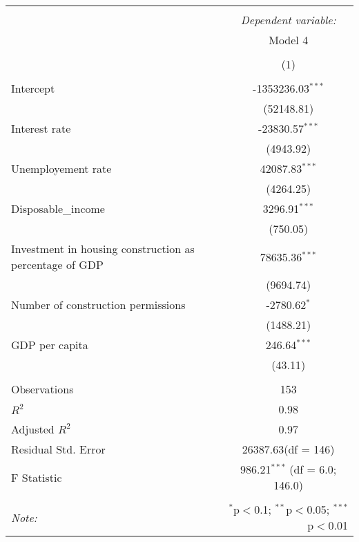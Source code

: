\begin{table}[!htbp] \centering
\begin{tabular}{@{\extracolsep{5pt}}lc}
\\[-1.8ex]\hline
\hline \\[-1.8ex]
& \multicolumn{1}{c}{\textit{Dependent variable:}} \
\cr \cline{1-2}
\\[-1.8ex] & \multicolumn{1}{c}{Model 4} \\\\[-1.8ex] & (1) \\
\hline \\[-1.8ex]
 Intercept & -1353236.03$^{***}$ \\
  & (52148.81) \\
 Interest rate & -23830.57$^{***}$ \\
  & (4943.92) \\
 Unemployement rate & 42087.83$^{***}$ \\
  & (4264.25) \\
 Disposable_income & 3296.91$^{***}$ \\
  & (750.05) \\
 Investment in housing construction as percentage of GDP & 78635.36$^{***}$ \\
  & (9694.74) \\
 Number of construction permissions & -2780.62$^{*}$ \\
  & (1488.21) \\
 GDP per capita & 246.64$^{***}$ \\
  & (43.11) \\
\hline \\[-1.8ex]
 Observations & 153 \\
 $R^2$ & 0.98 \\
 Adjusted $R^2$ & 0.97 \\
 Residual Std. Error & 26387.63(df = 146)  \\
 F Statistic & 986.21$^{***}$ (df = 6.0; 146.0) \\
\hline
\hline \\[-1.8ex]
\textit{Note:} & \multicolumn{1}{r}{$^{*}$p$<$0.1; $^{**}$p$<$0.05; $^{***}$p$<$0.01} \\
\end{tabular}
\end{table}
